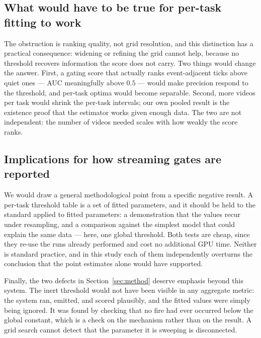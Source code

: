 \subsection{What would have to be true for per-task fitting to work}

The obstruction is ranking quality, not grid resolution, and this distinction has a
practical consequence: widening or refining the grid cannot help, because no
threshold recovers information the score does not carry. Two things would change
the answer. First, a gating score that actually ranks event-adjacent ticks above
quiet ones --- AUC meaningfully above $0.5$ --- would make precision respond to the
threshold, and per-task optima would become separable. Second, more videos per task
would shrink the per-task intervals; our own pooled result is the existence proof
that the estimator works given enough data. The two are not independent: the number
of videos needed scales with how weakly the score ranks.

\subsection{Implications for how streaming gates are reported}

We would draw a general methodological point from a specific negative result. A
per-task threshold table is a set of fitted parameters, and it should be held to
the standard applied to fitted parameters: a demonstration that the values recur
under resampling, and a comparison against the simplest model that could explain
the same data --- here, one global threshold. Both tests are cheap, since they
re-use the runs already performed and cost no additional GPU time. Neither is
standard practice, and in this study each of them independently overturns the
conclusion that the point estimates alone would have supported.

Finally, the two defects in Section~\ref{sec:method} deserve emphasis beyond this
system. The inert threshold would not have been visible in any aggregate metric:
the system ran, emitted, and scored plausibly, and the fitted values were simply
being ignored. It was found by checking that no fire had ever occurred below the
global constant, which is a check on the mechanism rather than on the result. A
grid search cannot detect that the parameter it is sweeping is disconnected.

